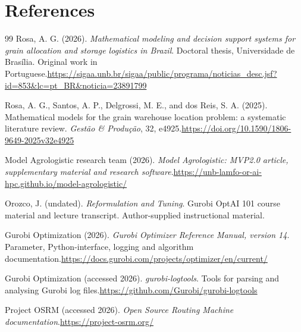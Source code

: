 \documentclass[11pt,a4paper]{article}
\newcommand{\technical}[2]{\footnote{#1: \url{#2}.}}
\begin{document}
\clearpage
\section*{References}
\begingroup
\renewcommand{\technical}[2]{\space\url{#2}}
\renewcommand{\section}[2]{}
\begin{thebibliography}{99}
Rosa, A. G. (2026).
\emph{Mathematical modeling and decision support systems for grain allocation and storage logistics in Brazil}.
Doctoral thesis, Universidade de Bras\'ilia. Original work in Portuguese.\technical{University thesis record}{https://sigaa.unb.br/sigaa/public/programa/noticias_desc.jsf?id=853&lc=pt_BR&noticia=23891799}

Rosa, A. G., Santos, A. P., Delgrossi, M. E., and dos Reis, S. A. (2025).
Mathematical models for the grain warehouse location problem: a systematic literature review.
\emph{Gest\~ao \& Produ\c{c}\~ao}, 32, e4925.\technical{Article DOI}{https://doi.org/10.1590/1806-9649-2025v32e4925}

Model Agrologistic research team (2026).
\emph{Model Agrologistic: MVP2.0 article, supplementary material and research software}.\technical{Project publication}{https://unb-lamfo-or-ai-hpc.github.io/model-agrologistic/}

Orozco, J. (undated).
\emph{Reformulation and Tuning}.
Gurobi OptAI 101 course material and lecture transcript. Author-supplied instructional material.

Gurobi Optimization (2026).
\emph{Gurobi Optimizer Reference Manual, version 14}.
Parameter, Python-interface, logging and algorithm documentation.\technical{Reference manual}{https://docs.gurobi.com/projects/optimizer/en/current/}

Gurobi Optimization (accessed 2026).
\emph{gurobi-logtools}.
Tools for parsing and analysing Gurobi log files.\technical{Software repository}{https://github.com/Gurobi/gurobi-logtools}

Project OSRM (accessed 2026).
\emph{Open Source Routing Machine documentation}.\technical{OSRM project}{https://project-osrm.org/}


\end{thebibliography}
\end{document}
